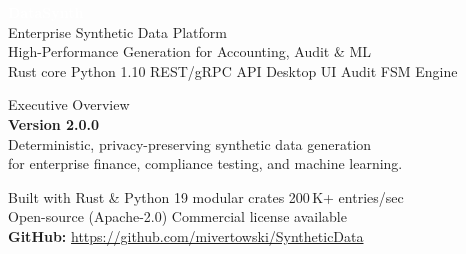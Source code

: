 \documentclass[11pt,a4paper]{article}
\begin{document}
\begin{titlepage}

\vspace*{1.5cm}
\begin{flushleft}
  {\fontsize{38}{44}\selectfont\bfseries\textcolor{white}{DataSynth}}\\[0.5em]
  {\fontsize{16}{20}\selectfont\textcolor{white!85}{Enterprise Synthetic Data Platform}}\\[0.3em]
  {\large\textcolor{white!65}{High-Performance Generation for Accounting, Audit \& ML}}\\[0.3em]
  {\normalsize\textcolor{white!50}{Rust core \textbullet{} Python 1.10 \textbullet{} REST/gRPC API \textbullet{} Desktop UI \textbullet{} Audit FSM Engine}}
\end{flushleft}

\vspace{5.5cm}

\begin{flushleft}
  \textcolor{midgray}{\large Executive Overview}\\[0.8em]
  {\Large\textcolor{brand}{\textbf{Version 2.0.0}}}\\[1.5em]
  \textcolor{midgray}{%
    Deterministic, privacy-preserving synthetic data generation\\
    for enterprise finance, compliance testing, and machine learning.%
  }
\end{flushleft}

\vfill
\begin{flushleft}
  \textcolor{midgray}{\small
    Built with Rust \& Python \textbullet{} 19 modular crates \textbullet{} 200\,K+ entries/sec\\[4pt]
    Open-source (Apache-2.0) \textbullet{} Commercial license available\\[4pt]
    \textbf{GitHub:} \url{https://github.com/mivertowski/SyntheticData}
  }
\end{flushleft}
\end{titlepage}
\end{document}
